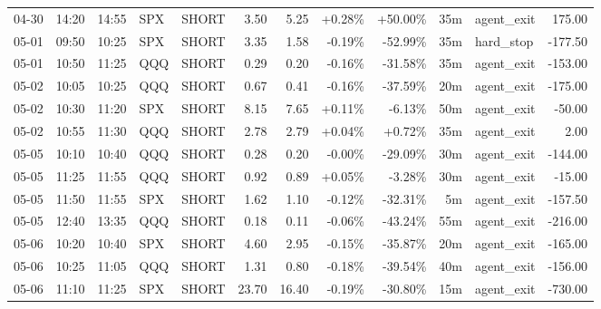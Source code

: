 \documentclass[11pt,a4paper,twoside]{article}
\begin{document}
\begin{center}
\begin{longtable}{>{\color{txtmain}}l l l l l r r r r r >{\color{txtmain}}l r}
04-30 & 14:20 & 14:55 & SPX & SHORT & 3.50 & 5.25 & \textcolor{wingreen}{+0.28\%} & \textcolor{wingreen}{+50.00\%} & 35m & agent\_exit & \textcolor{wingreen}{175.00} \\
05-01 & 09:50 & 10:25 & SPX & SHORT & 3.35 & 1.58 & \textcolor{lossred}{-0.19\%} & \textcolor{lossred}{-52.99\%} & 35m & hard\_stop & \textcolor{lossred}{-177.50} \\
05-01 & 10:50 & 11:25 & QQQ & SHORT & 0.29 & 0.20 & \textcolor{lossred}{-0.16\%} & \textcolor{lossred}{-31.58\%} & 35m & agent\_exit & \textcolor{lossred}{-153.00} \\
05-02 & 10:05 & 10:25 & QQQ & SHORT & 0.67 & 0.41 & \textcolor{lossred}{-0.16\%} & \textcolor{lossred}{-37.59\%} & 20m & agent\_exit & \textcolor{lossred}{-175.00} \\
05-02 & 10:30 & 11:20 & SPX & SHORT & 8.15 & 7.65 & \textcolor{wingreen}{+0.11\%} & \textcolor{lossred}{-6.13\%} & 50m & agent\_exit & \textcolor{lossred}{-50.00} \\
05-02 & 10:55 & 11:30 & QQQ & SHORT & 2.78 & 2.79 & \textcolor{wingreen}{+0.04\%} & \textcolor{wingreen}{+0.72\%} & 35m & agent\_exit & \textcolor{wingreen}{2.00} \\
05-05 & 10:10 & 10:40 & QQQ & SHORT & 0.28 & 0.20 & \textcolor{lossred}{-0.00\%} & \textcolor{lossred}{-29.09\%} & 30m & agent\_exit & \textcolor{lossred}{-144.00} \\
05-05 & 11:25 & 11:55 & QQQ & SHORT & 0.92 & 0.89 & \textcolor{wingreen}{+0.05\%} & \textcolor{lossred}{-3.28\%} & 30m & agent\_exit & \textcolor{lossred}{-15.00} \\
05-05 & 11:50 & 11:55 & SPX & SHORT & 1.62 & 1.10 & \textcolor{lossred}{-0.12\%} & \textcolor{lossred}{-32.31\%} & 5m & agent\_exit & \textcolor{lossred}{-157.50} \\
05-05 & 12:40 & 13:35 & QQQ & SHORT & 0.18 & 0.11 & \textcolor{lossred}{-0.06\%} & \textcolor{lossred}{-43.24\%} & 55m & agent\_exit & \textcolor{lossred}{-216.00} \\
05-06 & 10:20 & 10:40 & SPX & SHORT & 4.60 & 2.95 & \textcolor{lossred}{-0.15\%} & \textcolor{lossred}{-35.87\%} & 20m & agent\_exit & \textcolor{lossred}{-165.00} \\
05-06 & 10:25 & 11:05 & QQQ & SHORT & 1.31 & 0.80 & \textcolor{lossred}{-0.18\%} & \textcolor{lossred}{-39.54\%} & 40m & agent\_exit & \textcolor{lossred}{-156.00} \\
05-06 & 11:10 & 11:25 & SPX & SHORT & 23.70 & 16.40 & \textcolor{lossred}{-0.19\%} & \textcolor{lossred}{-30.80\%} & 15m & agent\_exit & \textcolor{lossred}{-730.00} \\

\end{longtable}
\end{center}
\end{document}
